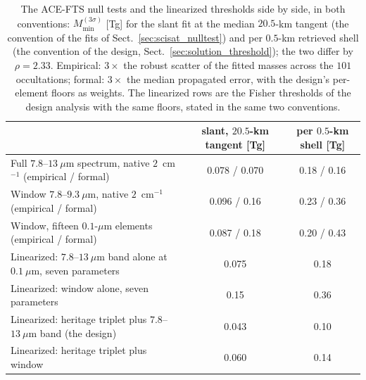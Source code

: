 \begin{table}[t]
\caption{The ACE-FTS null tests and the linearized thresholds side by side, in both conventions: $M_{\min}^{(3\sigma)}$ [Tg] for the slant fit at the median $20.5$-km tangent (the convention of the fits of Sect.~\ref{sec:scisat_nulltest}) and per $0.5$-km retrieved shell (the convention of the design, Sect.~\ref{sec:solution_threshold}); the two differ by $\rho=2.33$. Empirical: $3\times$ the robust scatter of the fitted masses across the $101$ occultations; formal: $3\times$ the median propagated error, with the design's per-element floors as weights. The linearized rows are the Fisher thresholds of the design analysis with the same floors, stated in the same two conventions.}
\label{tab:nulltest_conventions}
\centering
\small
\begin{tabular}{p{9.5cm}cc}
\toprule
 & slant, $20.5$-km tangent [Tg] & per $0.5$-km shell [Tg] \\
\midrule
Full $7.8$--$13~\mu$m spectrum, native $2$~cm$^{-1}$ (empirical / formal) & 0.078 / 0.070 & 0.18 / 0.16 \\
Window $7.8$--$9.3~\mu$m, native $2$~cm$^{-1}$ (empirical / formal) & 0.096 / 0.16 & 0.23 / 0.36 \\
Window, fifteen $0.1$-$\mu$m elements (empirical / formal) & 0.087 / 0.18 & 0.20 / 0.43 \\
Linearized: $7.8$--$13~\mu$m band alone at $0.1~\mu$m, seven parameters & 0.075 & 0.18 \\
Linearized: window alone, seven parameters & 0.15 & 0.36 \\
Linearized: heritage triplet plus $7.8$--$13~\mu$m band (the design) & 0.043 & 0.10 \\
Linearized: heritage triplet plus window & 0.060 & 0.14 \\
\bottomrule
\end{tabular}
\end{table}
